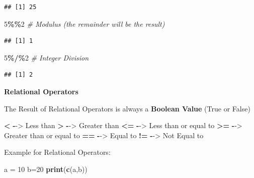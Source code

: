 \documentclass[
]{article}
\newenvironment{Shaded}{\begin{snugshade}}{\end{snugshade}}
\newcommand{\CommentTok}[1]{\textcolor[rgb]{0.56,0.35,0.01}{\textit{#1}}}
\newcommand{\DecValTok}[1]{\textcolor[rgb]{0.00,0.00,0.81}{#1}}
\newcommand{\FunctionTok}[1]{\textcolor[rgb]{0.13,0.29,0.53}{\textbf{#1}}}
\newcommand{\NormalTok}[1]{#1}
\newcommand{\OtherTok}[1]{\textcolor[rgb]{0.56,0.35,0.01}{#1}}
\newcommand{\SpecialCharTok}[1]{\textcolor[rgb]{0.81,0.36,0.00}{\textbf{#1}}}
\begin{document}
\begin{verbatim}
## [1] 25
\end{verbatim}

\begin{Shaded}
\begin{Highlighting}[]
\DecValTok{5}\SpecialCharTok{\%\%}\DecValTok{2} \CommentTok{\# Modulus (the remainder will be the result)}
\end{Highlighting}
\end{Shaded}

\begin{verbatim}
## [1] 1
\end{verbatim}

\begin{Shaded}
\begin{Highlighting}[]
\DecValTok{5}\SpecialCharTok{\%/\%}\DecValTok{2} \CommentTok{\# Integer Division}
\end{Highlighting}
\end{Shaded}

\begin{verbatim}
## [1] 2
\end{verbatim}

\textbf{Relational Operators}

The Result of Relational Operators is always a \textbf{Boolean Value}
(True or False)

\begin{Shaded}
\begin{Highlighting}[]
\SpecialCharTok{\textless{}}  \SpecialCharTok{{-}}\OtherTok{{-}\textgreater{}}\NormalTok{ Less than }
\SpecialCharTok{\textgreater{}}  \SpecialCharTok{{-}}\OtherTok{{-}\textgreater{}}\NormalTok{ Greater than}
\SpecialCharTok{\textless{}=} \SpecialCharTok{{-}}\OtherTok{{-}\textgreater{}}\NormalTok{ Less than or equal to}
\SpecialCharTok{\textgreater{}=} \SpecialCharTok{{-}}\OtherTok{{-}\textgreater{}}\NormalTok{ Greater than or equal to}
\SpecialCharTok{==} \SpecialCharTok{{-}}\OtherTok{{-}\textgreater{}}\NormalTok{ Equal to }
\SpecialCharTok{!=} \SpecialCharTok{{-}}\OtherTok{{-}\textgreater{}}\NormalTok{ Not Equal to }
\end{Highlighting}
\end{Shaded}

Example for Relational Operators:

\begin{Shaded}
\begin{Highlighting}[]
\NormalTok{a }\OtherTok{=} \DecValTok{10}
\NormalTok{b}\OtherTok{=}\DecValTok{20}
\FunctionTok{print}\NormalTok{(}\FunctionTok{c}\NormalTok{(a,b))}
\end{Highlighting}
\end{Shaded}
\end{document}
